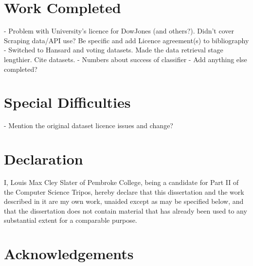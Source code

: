 \documentclass[12pt,a4paper,twoside,openright]{report}
\begin{document}
\section*{Work Completed}
 - Problem with University's licence for DowJones (and others?). Didn't cover Scraping data/API use? Be specific and add Licence agreement(s) to bibliography
 - Switched to Hansard and voting datasets. Made the data retrieval stage lengthier. Cite datasets.
 - Numbers about success of classifier
 - Add anything else completed?


\section*{Special Difficulties}
 - Mention the original dataset licence issues and change?
 
\newpage
\section*{Declaration}

I, Louis Max Cley Slater of Pembroke College, being a candidate for Part II of the Computer Science Tripos, hereby declare that this dissertation and the work described in it are my own work, unaided except as may be specified below, and that the dissertation does not contain material that has already been used to any substantial extent for a comparable purpose.

\bigskip
{}

\medskip
{}

\setcounter{tocdepth}{4}
\setcounter{secnumdepth}{4}
\tableofcontents

\listoffigures

\newpage
\section*{Acknowledgements}





\pagestyle{headings}
\end{document}
